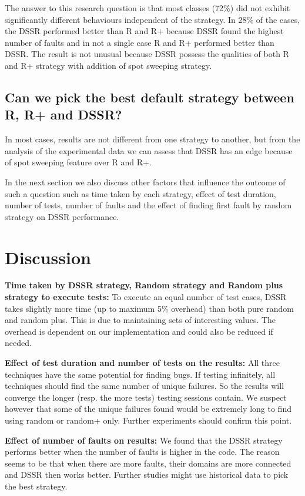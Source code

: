 \documentclass{acm_proc_article-sp}
\begin{document}
The answer to this research question is that most classes (72\%) did not exhibit significantly different behaviours independent of the strategy. In 28\% of the cases, the DSSR performed better than R and R+ because DSSR found the highest number of faults and in not a single case R and R+ performed better than DSSR. The result is not unusual because DSSR possess the qualities of both R and R+ strategy with addition of spot sweeping strategy. 


\subsection{Can we pick the best default strategy between R, R+ and DSSR?}
In most cases, results are not different from one strategy to another, but from the analysis of the experimental data we can assess that DSSR has an edge because of spot sweeping feature over R and R+. 

In the next section we also discuss other factors that influence the outcome of such a question such as time taken by each strategy, effect of test duration, number of tests, number of faults and the effect of finding first fault by random strategy on DSSR performance.




\section{Discussion}\label{sec:discussion}
\textbf{Time taken by DSSR strategy, Random strategy and Random plus strategy to execute tests:}
To execute an equal number of test cases, DSSR takes slightly more time (up to maximum 5\% overhead) than both pure random and random plus. This is due to maintaining sets of interesting values. The overhead is dependent on our implementation and could also be reduced if needed. 

\textbf{Effect of test duration and number of tests on the results:}
All three techniques have the same potential for finding bugs. If testing infinitely, all techniques should find the same number of unique failures.
So the results will converge the longer (resp. the more tests) testing sessions contain. We suspect however that some of the unique failures found would be extremely long to find using random or random+ only. Further experiments should confirm this point.


\textbf{Effect of number of faults on results:} 
We found that the DSSR strategy performs better when the number of faults is higher in the code. The reason seems to be that when there are more faults, their domains are more connected and DSSR then works better. Further studies might use historical data to pick the best strategy.
\end{document}
